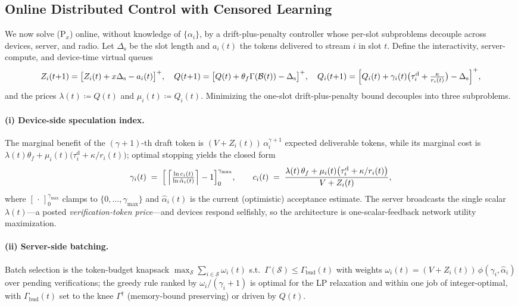 \documentclass[11pt]{article}
\theoremstyle{definition}
\theoremstyle{remark}
\newcommand{\cB}{\mathcal{B}}
\begin{document}
\subsection{Online Distributed Control with Censored Learning}\label{ssec:control}

We now solve (P$_x$) online, without knowledge of $\{\alpha_i\}$, by a
drift-plus-penalty controller whose per-slot subproblems decouple across
devices, server, and radio. Let $\Delta_{\mathrm{s}}$ be the slot length and
$a_i(t)$ the tokens delivered to stream $i$ in slot $t$. Define the
interactivity, server-compute, and device-time virtual queues
\begin{equation}\label{eq:vq}
Z_i(t{+}1)=\bigl[Z_i(t)+x\Delta_{\mathrm{s}}-a_i(t)\bigr]^{+},\quad
Q(t{+}1)=\bigl[Q(t)+\theta_f\Gamma(\cB(t))-\Delta_{\mathrm{s}}\bigr]^{+},\quad
Q_i(t{+}1)=\Bigl[Q_i(t)+\gamma_i(t)\bigl(\tau_i^{\mathrm{d}}
+\tfrac{\kappa}{r_i(t)}\bigr)-\Delta_{\mathrm{s}}\Bigr]^{+},
\end{equation}
and the prices $\lambda(t)\coloneqq Q(t)$ and $\mu_i(t)\coloneqq Q_i(t)$.
Minimizing the one-slot drift-plus-penalty bound decouples into three
subproblems.

\paragraph{(i) Device-side speculation index.}
The marginal benefit of the $(\gamma{+}1)$-th draft token is
$(V+Z_i(t))\,\alpha_i^{\gamma+1}$ expected deliverable tokens, while its
marginal cost is $\lambda(t)\theta_f+\mu_i(t)\bigl(\tau_i^{\mathrm{d}}+
\kappa/r_i(t)\bigr)$; optimal stopping yields the closed form
\begin{equation}\label{eq:index}
\gamma_i(t)\;=\;\Bigl[\,\Bigl\lceil
\tfrac{\ln c_i(t)}{\ln\hat{\alpha}_i(t)}\Bigr\rceil-1\Bigr]_{0}^{\gamma_{\max}},
\qquad
c_i(t)\;=\;\frac{\lambda(t)\,\theta_f
+\mu_i(t)\bigl(\tau_i^{\mathrm{d}}+\kappa/r_i(t)\bigr)}{V+Z_i(t)},
\end{equation}
where $[\,\cdot\,]_{0}^{\gamma_{\max}}$ clamps to $\{0,\dots,\gamma_{\max}\}$
and $\hat{\alpha}_i(t)$ is the current (optimistic) acceptance estimate.
The server broadcasts the single scalar $\lambda(t)$---a posted
\emph{verification-token price}---and devices respond selfishly, so the
architecture is one-scalar-feedback network utility maximization.

\paragraph{(ii) Server-side batching.}
Batch selection is the token-budget knapsack
$\max_{\mathcal{S}}\sum_{i\in\mathcal{S}}\omega_i(t)$ s.t.\
$\Gamma(\mathcal{S})\le\Gamma_{\mathrm{bud}}(t)$ with weights
$\omega_i(t)=(V+Z_i(t))\,\phi(\gamma_i,\hat{\alpha}_i)$ over pending
verifications; the greedy rule ranked by $\omega_i/(\gamma_i+1)$ is optimal
for the LP relaxation and within one job of integer-optimal, with
$\Gamma_{\mathrm{bud}}(t)$ set to the knee $\Gamma^{\dagger}$ (memory-bound
preserving) or driven by $Q(t)$.
\end{document}
